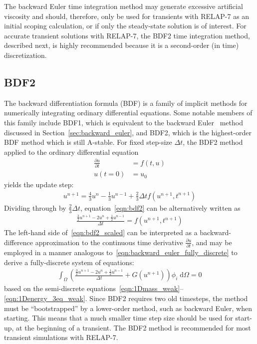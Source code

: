 The backward Euler time integration method may generate excessive artificial
viscosity and should, therefore, only be used for transients with RELAP-7
as an initial scoping calculation, or if only the steady-state solution is of
interest. For accurate transient solutions with RELAP-7, the BDF2 time
integration method, described next, is highly recommended because it is
a second-order (in time) discretization.
%
\subsection{BDF2\label{sec:bdf2}}
%
The backward differentiation formula (BDF) is a family of implicit
methods for numerically integrating ordinary differential equations.
Some notable members of this family include BDF1, which is equivalent
to the backward Euler~\cite{Ascher_1998} method discussed in
Section~\ref{sec:backward_euler}, and BDF2, which is the highest-order
BDF method which is still A-stable.  For fixed step-size $\Delta t$, the BDF2 method 
applied to the ordinary differential equation
\begin{align}
  \frac{\partial u}{\partial t} &= f(t, u)
  \\
  u(t=0) &= u_0
\end{align}
yields the update step:
\begin{align}
\label{eqn:bdf2}
u^{n+1} = \frac{4}{3}u^n - \frac{1}{3}u^{n-1} + \frac{2}{3} \Delta t f(u^{n+1}, t^{n+1})
\end{align}
Dividing through by $\frac{2}{3} \Delta t$, equation~\eqref{eqn:bdf2} can be 
alternatively written as
\begin{align}
\label{eqn:bdf2_scaled}
\frac{\frac{3}{2}u^{n+1} - 2u^n  + \frac{1}{2}u^{n-1}}{\Delta t} = f(u^{n+1}, t^{n+1})
\end{align}
The left-hand side of~\eqref{eqn:bdf2_scaled} can be interpreted as a
backward-difference approximation to the continuous time derivative
$\frac{\partial u}{\partial t}$, and may be employed in a manner analogous
to~\eqref{eqn:backward_euler_fully_discrete} to derive a fully-discrete
system of equations:
\begin{align}
  \label{eqn:bdf2_fully_discrete}
  \int_{\Omega} \left( \frac{\frac{3}{2}u^{n+1} - 2u^n  + \frac{1}{2}u^{n-1}}{\Delta t} + G(u^{n+1}) \right) \phi_i \; \text{d}{\Omega} = 0
\end{align}
based on the semi-discrete equations~\eqref{eqn:1Dmass_weak}--\eqref{eqn:1Denergy_3eq_weak}.
Since BDF2 requires two old timesteps, the method must be
``bootstrapped'' by a lower-order method, such as backward Euler, when
starting.  This means that a much smaller time step size should be used
for start-up, at the beginning of a transient.  The BDF2 method is 
recommended for most transient simulations with RELAP-7.
%
